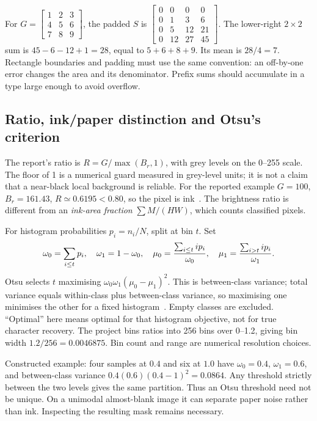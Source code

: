 For $G=\left[\begin{smallmatrix}1&2&3\\4&5&6\\7&8&9\end{smallmatrix}\right]$,
the padded $S$ is
$\left[\begin{smallmatrix}0&0&0&0\\0&1&3&6\\0&5&12&21\\0&12&27&45\end{smallmatrix}\right]$.
The lower-right $2\times2$ sum is $45-6-12+1=28$, equal to $5+6+8+9$.
Its mean is $28/4=7$. Rectangle boundaries and padding must use the same
convention: an off-by-one error changes the area and its denominator.
Prefix sums should accumulate in a type large enough to avoid overflow.

\subsection{Ratio, ink/paper distinction and Otsu's criterion}
The report's ratio is $R=G/\max(B_r,1)$, with grey levels on the 0--255
scale. The floor of 1 is a numerical guard measured in grey-level units;
it is not a claim that a near-black local background is reliable. For the
reported example $G=100$, $B_r=161.43$, $R\simeq0.6195<0.80$, so the pixel
is ink~\cite{finalreport2026}. The brightness ratio is different from an
\emph{ink-area fraction} $\sum M/(HW)$, which counts classified pixels.

For histogram probabilities $p_i=n_i/N$, split at bin $t$. Set
\[
\omega_0=\sum_{i\le t}p_i,\quad \omega_1=1-\omega_0,\quad
\mu_0={\sum_{i\le t}i p_i\over\omega_0},\quad
\mu_1={\sum_{i>t}i p_i\over\omega_1}.
\]
Otsu selects $t$ maximising $\omega_0\omega_1(\mu_0-\mu_1)^2$.
This is between-class variance; total variance equals within-class plus
between-class variance, so maximising one minimises the other for a fixed
histogram~\cite{otsu1979}. Empty classes are excluded. ``Optimal'' here
means optimal for that histogram objective, not for true character recovery.
The project bins ratios into 256 bins over 0--1.2, giving bin width
$1.2/256=0.0046875$. Bin count and range are numerical resolution choices.

Constructed example: four samples at $0.4$ and six at $1.0$ have
$\omega_0=0.4$, $\omega_1=0.6$, and between-class variance
$0.4(0.6)(0.4-1)^2=0.0864$. Any threshold strictly between the two levels
gives the same partition. Thus an Otsu threshold need not be unique.
On a unimodal almost-blank image it can separate paper noise rather than ink.
Inspecting the resulting mask remains necessary.


